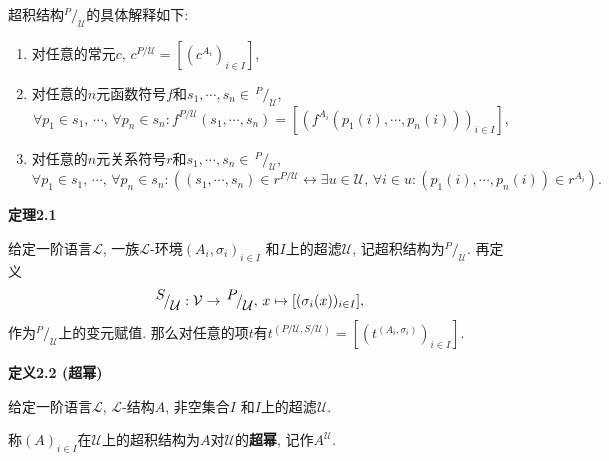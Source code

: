 \documentclass[UTF8]{ctexart}
\begin{document}
\vspace{10pt}

超积结构$^{\displaystyle P}\!/_{\displaystyle\mathcal{U}}$的具体解释如下:
\vspace{3pt}
\begin{enumerate}
    \item 对任意的常元$c$, $c^{P/\mathcal{U}}=[(c^{A_i})_{i\in I}]$,
    \item 对任意的$n$元函数符号$f$和$s_1,\cdots,s_n\in\,\!
    ^{\displaystyle P}\!/_{\displaystyle\mathcal{U}}$,
    \[
        \forall p_1\in s_1,\,\cdots,\,\forall p_n\in s_n:
        f^{P/\mathcal{U}}(s_1,\cdots,s_n)=
        [(f^{A_i}(p_1(i),\cdots,p_n(i)))_{i\in I}],
    \]
    \item 对任意的$n$元关系符号$r$和$s_1,\cdots,s_n\in\,\!
    ^{\displaystyle P}\!/_{\displaystyle\mathcal{U}}$,
    \[
        \forall p_1\in s_1,\,\cdots,\,\forall p_n\in s_n:
        ((s_1,\cdots,s_n)\in r^{P/\mathcal{U}}\leftrightarrow\exists u\in\mathcal{U},\,
        \forall i\in u:(p_1(i),\cdots,p_n(i))\in r^{A_i}).
    \]
\end{enumerate}

\vspace{10pt}

\hypertarget{sec:定理2.1}{}
\noindent\textbf{定理2.1}

给定一阶语言$\mathcal{L}$, 一族$\mathcal{L}$-环境$(A_i,\sigma_i)_{i\in I}$
和$I$上的超滤$\mathcal{U}$,
记超积结构为$^{\displaystyle P}\!/_{\displaystyle\mathcal{U}}$. 再定义
\[
    ^{\displaystyle S}\!/_{\displaystyle\mathcal{U}}:
    \mathcal{V}\to\,^{\displaystyle P}\!/_{\displaystyle\mathcal{U}},\,
    x\mapsto[(\sigma_i(x))_{i\in I}],\\[3pt]
\]
作为$^{\displaystyle P}\!/_{\displaystyle\mathcal{U}}$上的变元赋值.
那么对任意的项$t$有$t^{(P/\mathcal{U},S/\mathcal{U})}
=[(t^{(A_i,\sigma_i)})_{i\in I}]$.

\vspace{10pt}

\hypertarget{sec:定义2.2}{}
\noindent\textbf{定义2.2 (超幂)}

给定一阶语言$\mathcal{L}$, $\mathcal{L}$-结构$A$, 非空集合$I$
和$I$上的超滤$\mathcal{U}$.

称$(A)_{i\in I}$在$\mathcal{U}$上的超积结构为$A$对$\mathcal{U}$的\textbf{超幂},
记作$A^\mathcal{U}$.
\end{document}
